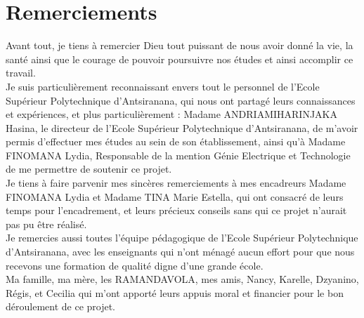 
\chapter*{Remerciements}
	
Avant tout, je tiens à remercier Dieu tout puissant de nous avoir donné la vie, la santé ainsi que le courage de pouvoir poursuivre nos études et ainsi accomplir ce travail.\\[1cm] Je suis particulièrement reconnaissant envers tout le personnel de l’Ecole Supérieur Polytechnique d’Antsiranana, qui nous ont partagé leurs connaissances et expériences, et plus particulièrement :
Madame ANDRIAMIHARINJAKA Hasina, le directeur de l’Ecole Supérieur Polytechnique d’Antsiranana, de
m’avoir permis d’effectuer mes études au sein de son établissement, ainsi qu’à Madame FINOMANA Lydia, Responsable de la  mention Génie Electrique et Technologie de me permettre de soutenir ce projet.\\[1cm]
Je tiens à faire parvenir mes sincères remerciements à mes encadreurs Madame FINOMANA Lydia et Madame TINA Marie Estella, qui ont consacré de leurs temps pour l'encadrement, et leurs précieux conseils sans qui ce projet n’aurait pas pu être réalisé.
\\[1cm]
Je remercies aussi toutes l’équipe pédagogique de l’Ecole Supérieur Polytechnique d’Antsiranana, avec les enseignants qui n’ont ménagé aucun effort pour que nous recevons une formation de qualité digne d’une grande école.\\[1cm]
Ma famille, ma mère, les RAMANDAVOLA, mes amis, Nancy, Karelle, Dzyanino, Régis, et Cecilia qui m'ont apporté leurs appuis moral et financier pour le bon déroulement de ce projet.


\setcounter{page}{1}







